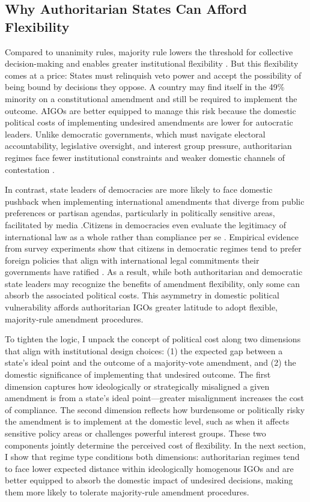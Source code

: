 \documentclass[12pt]{article}
\begin{document}
\subsection{Why Authoritarian States Can Afford Flexibility}

Compared to unanimity rules, majority rule lowers the threshold for collective decision-making and enables greater institutional flexibility \parencite{posner_voting_2014}. But this flexibility comes at a price: States must relinquish veto power and accept the possibility of being bound by decisions they oppose. A country may find itself in the 49\% minority on a constitutional amendment and still be required to implement the outcome. AIGOs are better equipped to manage this risk because the domestic political costs of implementing undesired amendments are lower for autocratic leaders. Unlike democratic governments, which must navigate electoral accountability, legislative oversight, and interest group pressure, authoritarian regimes face fewer institutional constraints and weaker domestic channels of contestation \parencite{hollyer_why_2011}.

In contrast, state leaders of democracies are more likely to face domestic pushback when implementing international amendments that diverge from public preferences or partisan agendas, particularly in politically sensitive areas, facilitated by media \parencite{dai_why_2005, baum_relationships_2008}.Citizens in democracies even evaluate the legitimacy of international law as a whole rather than compliance per se \parencite[]{morse_smoke_2025}.   Empirical evidence from survey experiments show that citizens in democratic regimes tend to prefer foreign policies that align with international legal commitments their governments have ratified \parencite{wallace_international_2013, lupu_laws_2024}. As a result, while both authoritarian and democratic state leaders may recognize the benefits of amendment flexibility, only some can absorb the associated political costs. This asymmetry in domestic political vulnerability affords authoritarian IGOs greater latitude to adopt flexible, majority-rule amendment procedures.

To tighten the logic, I unpack the concept of political cost along two dimensions that align with institutional design choices: (1) the expected gap between a state's ideal point and the outcome of a majority-vote amendment, and (2) the domestic significance of implementing that undesired outcome. The first dimension captures how ideologically or strategically misaligned a given amendment is from a state's ideal point---greater misalignment increases the cost of compliance. The second dimension reflects how burdensome or politically risky the amendment is to implement at the domestic level, such as when it affects sensitive policy areas or challenges powerful interest groups. These two components jointly determine the perceived cost of flexibility. In the next section, I show that regime type conditions both dimensions: authoritarian regimes tend to face lower expected distance within ideologically homogenous IGOs and are better equipped to absorb the domestic impact of undesired decisions, making them more likely to tolerate majority-rule amendment procedures.
\end{document}
